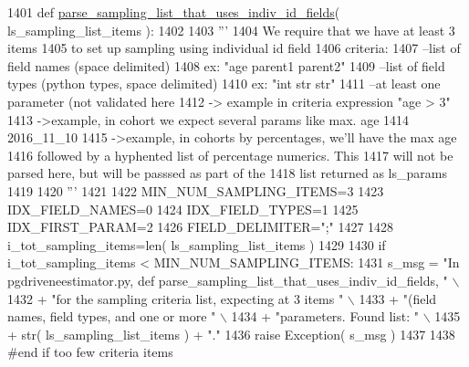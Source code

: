 \begin{DoxyCode}
1401 \textcolor{keyword}{def }\hyperlink{namespacenegui_1_1pgdriveneestimator_a8918df5a619173d4baa530e79dfe2385}{parse\_sampling\_list\_that\_uses\_indiv\_id\_fields}( 
      ls\_sampling\_list\_items ):
1402 
1403     \textcolor{stringliteral}{'''}
1404 \textcolor{stringliteral}{    We require that we have at least 3 items}
1405 \textcolor{stringliteral}{    to set up  sampling using individual id field}
1406 \textcolor{stringliteral}{    criteria:}
1407 \textcolor{stringliteral}{    --list of field names (space delimited)}
1408 \textcolor{stringliteral}{        ex: "age parent1 parent2"}
1409 \textcolor{stringliteral}{    --list of field types (python types, space delimited)}
1410 \textcolor{stringliteral}{        ex: "int str str"}
1411 \textcolor{stringliteral}{    --at least one parameter (not validated here}
1412 \textcolor{stringliteral}{        -> example in criteria expression  "age > 3"}
1413 \textcolor{stringliteral}{        ->example, in cohort we expect several params like max. age     }
1414 \textcolor{stringliteral}{    2016\_11\_10}
1415 \textcolor{stringliteral}{        ->example, in cohorts by percentages, we'll have the max age}
1416 \textcolor{stringliteral}{          followed by a hyphented list of percentage numerics.  This}
1417 \textcolor{stringliteral}{          will not be parsed here, but will be passsed as part of the}
1418 \textcolor{stringliteral}{          list returned as  ls\_params}
1419 \textcolor{stringliteral}{}
1420 \textcolor{stringliteral}{    '''}
1421 
1422     MIN\_NUM\_SAMPLING\_ITEMS=3
1423     IDX\_FIELD\_NAMES=0
1424     IDX\_FIELD\_TYPES=1
1425     IDX\_FIRST\_PARAM=2
1426     FIELD\_DELIMITER=\textcolor{stringliteral}{";"}
1427 
1428     i\_tot\_sampling\_items=len( ls\_sampling\_list\_items )
1429 
1430     \textcolor{keywordflow}{if} i\_tot\_sampling\_items < MIN\_NUM\_SAMPLING\_ITEMS:
1431         s\_msg = \textcolor{stringliteral}{"In pgdriveneestimator.py, def parse\_sampling\_list\_that\_uses\_indiv\_id\_fields, "} \(\backslash\)
1432                     + \textcolor{stringliteral}{"for the sampling criteria list, expecting at 3 items "} \(\backslash\)
1433                     + \textcolor{stringliteral}{"(field names, field types, and one or more "} \(\backslash\)
1434                     + \textcolor{stringliteral}{"parameters.  Found list: "} \(\backslash\)
1435                     + str( ls\_sampling\_list\_items ) + \textcolor{stringliteral}{"."}
1436         \textcolor{keywordflow}{raise} Exception( s\_msg )
1437 
1438     \textcolor{comment}{#end if too few criteria items}

\end{DoxyCode}
